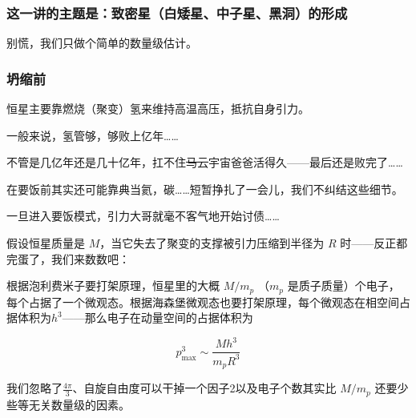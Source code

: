\documentclass[CJK,13pt]{beamer}
\date{}
\begin{document}
  \bch

 

  \begin{frame}
    \frametitle{这一讲的主题是：致密星（白矮星、中子星、黑洞）的形成}

    
    别慌，我们只做个简单的数量级估计。
    
  \end{frame}


  \begin{frame}
    \frametitle{坍缩前}

    
    恒星主要靠燃烧（聚变）氢来维持高温高压，抵抗自身引力。

    \skiplines

    一般来说，氢管够，够败上亿年……
    
  \end{frame}
  


  \begin{frame}

    不管是几亿年还是几十亿年，扛不住\sout{马云}宇宙爸爸活得久——最后还是败完了……


    在要饭前其实还可能靠典当氦，碳……短暂挣扎了一会儿，我们不纠结这些细节。
    
  \end{frame}


  \begin{frame}

    
    一旦进入要饭模式，引力大哥就毫不客气地开始讨债……
    
  \end{frame}


  \begin{frame}

    假设恒星质量是 $M$，当它失去了聚变的支撑被引力压缩到半径为 $R$ 时——反正都完蛋了，我们来数数吧：

        

    根据泡利费米子要打架原理，恒星里的大概 $M/m_p$ （$m_p$ 是质子质量）个电子，每个占据了一个微观态。根据海森堡微观态也要打架原理，每个微观态在相空间占据体积为$h^3$——那么电子在动量空间的占据体积为

    $$ p_{\max}^3 \sim \frac{Mh^3}{m_pR^3} $$
    
    {\scriptsize 我们忽略了$\frac{4\pi}{3}$、自旋自由度可以干掉一个因子2以及电子个数其实比 $M/m_p$ 还要少些等无关数量级的因素。}
  \end{frame}
\end{document}
